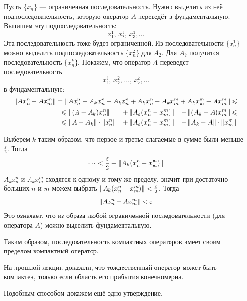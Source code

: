 \documentclass[12pt]{article}
\begin{document}
\begin{enumerate}
		Пусть $\{x_n\}$ --- ограниченная последовательность. Нужно выделить из неё подпоследовательность, которую оператор $A$ 
		переведёт в фундаментальную. Выпишем эту подпоследовательность:
		$$x_1^1,\,x_2^1,\,x_3^1,\dots$$
		Эта последовательность тоже будет ограниченной. Из последовательности $\{x^1_n\}$ можно выделить подпоследовательность 
		$\{x^2_n\}$ для $A_2$. Для $A_k$ получится последовательность $\{x^k_n\}$. Покажем, что оператор $A$ переведёт 
		последовательность
		$$x^1_1,\,x^2_2,\,\dots,\,x^k_k,\dots$$
		в фундаментальную:
		\begin{align*}
			\left\| Ax_n^n - Ax_m^m \right\| = \left\| Ax_n^n - A_kx^n_n + A_kx_n^n + A_kx_n^n - A_kx_m^m + A_kx_m^m - Ax_m^m \right\| \leqslant \\
			\begin{aligned}
				&\leqslant \left\| (A-A_k)x_n^n \right\| &+ &\left\| A_k(x_n^n - x_m^m) \right\| &+ &\left\| (A_k - A)x_m^m \right\| \leqslant \\
				&\leqslant \left\| A-A_k \right\|\cdot\left\| x_n^n \right\| &+ &\left\| A_k(x_n^n - x_m^m) \right\| &+ &\left\| A_k - A \right\| \cdot\left\| x_m^m \right\|
			\end{aligned}
		\end{align*}
		
		Выберем $k$ таким образом, что первое и третье слагаемые в сумме были меньше $\frac{\varepsilon}{2}$. Тогда 
		$$\dots < \frac{\varepsilon}{2} + \left\| A_k(x_n^n - x_m^m) \right\|$$
		$A_k x_n^n$ и $A_k x_m^m$ сходятся к одному и тому же пределу, значит при достаточно больших $n$ и $m$ можем выбрать
		$\left\| A_k(x_n^n - x_m^m) \right\| < \frac{\varepsilon}{2}$. Тогда
		$$\left\| Ax_n^n - Ax_m^m \right\| < \varepsilon$$
		Это означает, что из образа любой ограниченной последовательности (для оператора $A$) можно выделить фундаментальную.
		
		Таким образом, последовательность компактных операторов имеет своим пределом компактный оператор.
	\end{enumerate}


	На прошлой лекции доказали, что тождественный оператор может быть компактен, только если область его прибытия конечномерна.
	
	Подобным способом докажем ещё одно утверждение.
	
\end{document}
